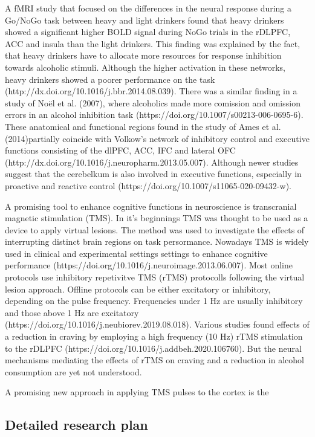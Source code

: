 \documentclass[12pt]{article}
\begin{document}
A fMRI study that focused on the differences in the neural response during a Go/NoGo task between heavy and light drinkers found that heavy drinkers showed a significant higher BOLD signal during NoGo trials in the rDLPFC, ACC and insula than the light drinkers. This finding was explained by the fact, that heavy drinkers have to allocate more resources for response inhibition towards alcoholic stimuli. Although the higher activation in these networks, heavy drinkers showed a poorer performance on the task (http://dx.doi.org/10.1016/j.bbr.2014.08.039). There was a similar finding in a study of Noël et al. (2007), where alcoholics made more comission and omission errors in an alcohol inhibition task (https://doi.org/10.1007/s00213-006-0695-6). These anatomical and functional regions found in the study of Ames et al. (2014)partially coincide with Volkow's network of inhibitory control and executive functions consisting of the dlPFC, ACC, IFC and lateral OFC (http://dx.doi.org/10.1016/j.neuropharm.2013.05.007). Although newer studies suggest that the cerebelkum is also involved in executive functions, especially in proactive and reactive control (https://doi.org/10.1007/s11065-020-09432-w). 

A promising tool to enhance cognitive functions in neuroscience is transcranial magnetic stimulation (TMS). In it's beginnings TMS was thought to be used as a device to apply virtual lesions. The method was used to investigate the effects of interrupting distinct brain regions on task persormance. Nowadays TMS is widely used in clinical and experimental settings settings to enhance cognitive performance (https://doi.org/10.1016/j.neuroimage.2013.06.007). Most online protocols use inhibitory repetivitve TMS (rTMS) protocolls following the virtual lesion approach. Offline protocols can be either excitatory or inhibitory, depending on the pulse frequency. Frequencies under 1 Hz are usually inhibitory and those above 1 Hz are excitatory (https://doi.org/10.1016/j.neubiorev.2019.08.018). Various studies found effects of a reduction in craving by employing a high frequency (10 Hz) rTMS stimulation to the rDLPFC (https://doi.org/10.1016/j.addbeh.2020.106760). But the neural mechanisms mediating the effects of rTMS on craving and a reduction in alcohol consumption are yet not understood. 

A promising new approach in applying TMS pulses to the cortex is the 

\subsection{Detailed research plan}
\end{document}
